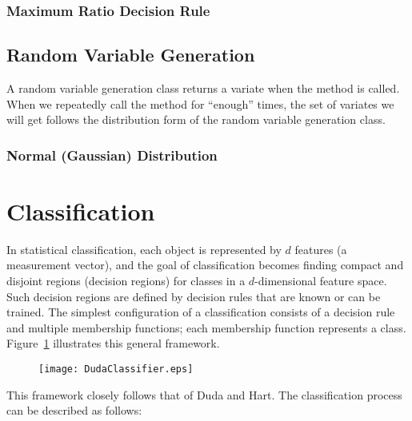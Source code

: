 

\subsubsection{Maximum Ratio Decision Rule}
\label{sec:MaximumRatioDecisionRule}



\subsection{Random Variable Generation}
\label{sec:RandomVariableGeneration}

A random variable generation class returns a variate when the
 method is called. When we repeatedly call the method
for ``enough'' times, the set of variates we will get follows
the distribution form of the random variable generation class.
 
\subsubsection{Normal (Gaussian) Distribution}
\label{sec:NormalVariateGeneration}



\section{Classification}
\label{sec:Classification}

In statistical classification, each object is represented by $d$
features (a measurement vector), and the goal of classification
becomes finding compact and disjoint regions (decision
regions\cite{Duda2000}) for classes in a $d$-dimensional feature
space. Such decision regions are defined by
decision rules that are known or can be trained.  The simplest
configuration of a classification consists of a decision rule and
multiple membership functions; each membership function represents a
class. Figure~\ref{fig:simple} illustrates this general framework.

\begin{figure}[h]
  \centering
  \texttt{[image: DudaClassifier.eps]}
  \label{fig:simple}
\end{figure}

This framework closely follows that of Duda and
Hart\cite{Duda2000}. The classification process can be described
as follows:

